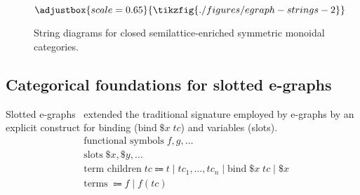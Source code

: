 

\begin{figure*}
	\[
		\adjustbox{scale=0.65}{
			\tikzfig{./figures/egraph-strings-2}
		}
	\]
	\captionsetup{skip=0pt, belowskip=-2ex}
	\caption{String diagrams for closed semilattice-enriched symmetric monoidal categories.}
	\label{fig:egraph-strings}
\end{figure*}

\subsection{Categorical foundations for slotted e-graphs}

Slotted e-graphs~\cite{slotted-egraphs} extended the traditional signature employed by e-graphs by an explicit construct for binding ($\text{bind}\; \$x\; tc$) and variables (slots).
	\begin{align*}
		 & \text{functional symbols}\; f, g, \ldots                                                                   \\
		 & \text{slots}\;  \$x, \$y, \ldots                                                                           \\
		 & \text{term children}\; tc  \Coloneqq t \;|\; tc_{1}, \ldots, tc_{n} \;|\; \text{bind}\; \$x\; tc \;|\; \$x \\
		 & \text{terms}\;  \Coloneqq f \;|\; f(tc)
	\end{align*}

